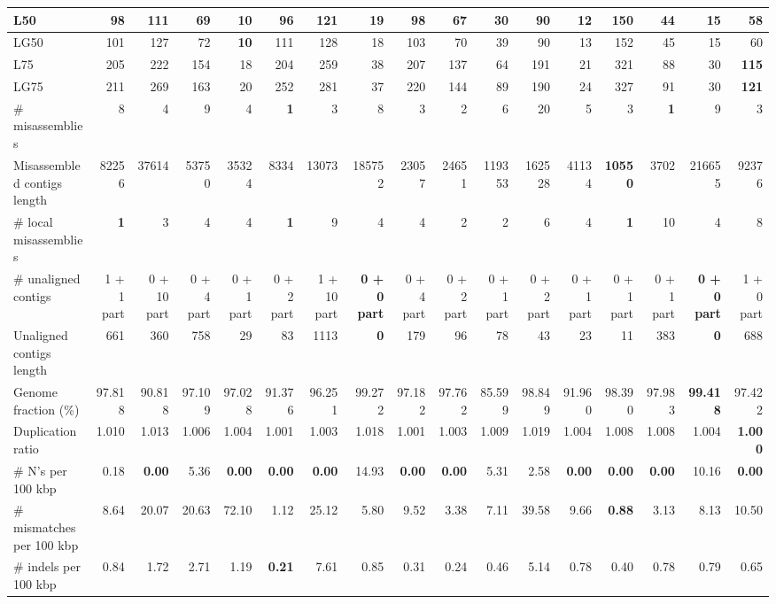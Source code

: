 \documentclass[12pt,a4paper]{article}
\begin{document}
\begin{table}[ht]
\begin{center}
\begin{tabular}{|l*{16}{|r}|}
L50 & 98 & 111 & 69 & {\bf 10} & 96 & 121 & 19 & 98 & 67 & 30 & 90 & 12 & 150 & 44 & 15 & 58 \\ \hline
LG50 & 101 & 127 & 72 & {\bf 10} & 111 & 128 & 18 & 103 & 70 & 39 & 90 & 13 & 152 & 45 & 15 & 60 \\ \hline
L75 & 205 & 222 & 154 & 18 & 204 & 259 & 38 & 207 & 137 & 64 & 191 & 21 & 321 & 88 & 30 & {\bf 115} \\ \hline
LG75 & 211 & 269 & 163 & 20 & 252 & 281 & 37 & 220 & 144 & 89 & 190 & 24 & 327 & 91 & 30 & {\bf 121} \\ \hline
\# misassemblies & 8 & 4 & 9 & 4 & {\bf 1} & 3 & 8 & 3 & 2 & 6 & 20 & 5 & 3 & {\bf 1} & 9 & 3 \\ \hline
Misassembled contigs length & 82256 & 37614 & 53750 & 35324 & 8334 & 13073 & 185752 & 23057 & 24651 & 119353 & 162528 & 41134 & {\bf 10550} & 3702 & 216655 & 92376 \\ \hline
\# local misassemblies & {\bf 1} & 3 & 4 & 4 & {\bf 1} & 9 & 4 & 4 & 2 & 2 & 6 & 4 & {\bf 1} & 10 & 4 & 8 \\ \hline
\# unaligned contigs & 1 + 1 part & 0 + 10 part & 0 + 4 part & 0 + 1 part & 0 + 2 part & 1 + 10 part & {\bf 0 + 0 part} & 0 + 4 part & 0 + 2 part & 0 + 1 part & 0 + 2 part & 0 + 1 part & 0 + 1 part & 0 + 1 part & {\bf 0 + 0 part} & 1 + 0 part \\ \hline
Unaligned contigs length & 661 & 360 & 758 & 29 & 83 & 1113 & {\bf 0} & 179 & 96 & 78 & 43 & 23 & 11 & 383 & {\bf 0} & 688 \\ \hline
Genome fraction (\%) & 97.818 & 90.818 & 97.109 & 97.028 & 91.376 & 96.251 & 99.272 & 97.182 & 97.762 & 85.599 & 98.849 & 91.960 & 98.390 & 97.983 & {\bf 99.418} & 97.422 \\ \hline
Duplication ratio & 1.010 & 1.013 & 1.006 & 1.004 & 1.001 & 1.003 & 1.018 & 1.001 & 1.003 & 1.009 & 1.019 & 1.004 & 1.008 & 1.008 & 1.004 & {\bf 1.000} \\ \hline
\# N's per 100 kbp & 0.18 & {\bf 0.00} & 5.36 & {\bf 0.00} & {\bf 0.00} & {\bf 0.00} & 14.93 & {\bf 0.00} & {\bf 0.00} & 5.31 & 2.58 & {\bf 0.00} & {\bf 0.00} & {\bf 0.00} & 10.16 & {\bf 0.00} \\ \hline
\# mismatches per 100 kbp & 8.64 & 20.07 & 20.63 & 72.10 & 1.12 & 25.12 & 5.80 & 9.52 & 3.38 & 7.11 & 39.58 & 9.66 & {\bf 0.88} & 3.13 & 8.13 & 10.50 \\ \hline
\# indels per 100 kbp & 0.84 & 1.72 & 2.71 & 1.19 & {\bf 0.21} & 7.61 & 0.85 & 0.31 & 0.24 & 0.46 & 5.14 & 0.78 & 0.40 & 0.78 & 0.79 & 0.65 \\ \hline

\end{tabular}
\end{center}
\end{table}
\end{document}
